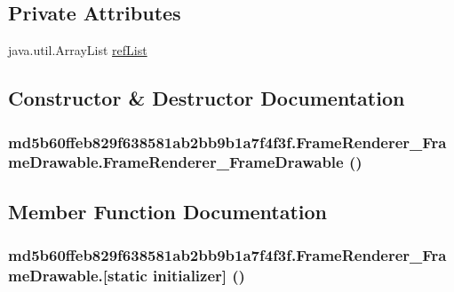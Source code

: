 \subsection*{Private Attributes}
\begin{CompactItemize}
\item 
java.util.ArrayList \hyperlink{classmd5b60ffeb829f638581ab2bb9b1a7f4f3f_1_1_frame_renderer___frame_drawable_9768e82d526f8d55fc2d2d5cc7f6bf10}{refList}
\end{CompactItemize}


\subsection{Constructor \& Destructor Documentation}
\hypertarget{classmd5b60ffeb829f638581ab2bb9b1a7f4f3f_1_1_frame_renderer___frame_drawable_f5152f9b53fd5e2264906592723a537c}{
\subsubsection[{FrameRenderer\_\-FrameDrawable}]{\setlength{\rightskip}{0pt plus 5cm}md5b60ffeb829f638581ab2bb9b1a7f4f3f.FrameRenderer\_\-FrameDrawable.FrameRenderer\_\-FrameDrawable ()}}
\label{classmd5b60ffeb829f638581ab2bb9b1a7f4f3f_1_1_frame_renderer___frame_drawable_f5152f9b53fd5e2264906592723a537c}




\subsection{Member Function Documentation}
\hypertarget{classmd5b60ffeb829f638581ab2bb9b1a7f4f3f_1_1_frame_renderer___frame_drawable_d75481554fbea368094981b7051aa07b}{
\subsubsection[{[static initializer]}]{\setlength{\rightskip}{0pt plus 5cm}md5b60ffeb829f638581ab2bb9b1a7f4f3f.FrameRenderer\_\-FrameDrawable.\mbox{[}static initializer\mbox{]} ()}}
\label{classmd5b60ffeb829f638581ab2bb9b1a7f4f3f_1_1_frame_renderer___frame_drawable_d75481554fbea368094981b7051aa07b}


